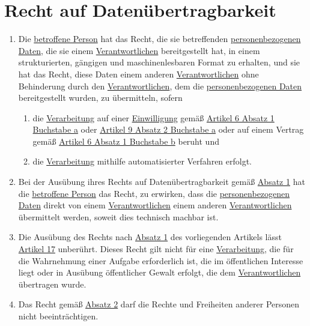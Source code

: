 \chapter{Recht auf Datenübertragbarkeit}
\label{ch:20}


\begin{enumerate}

  \item Die \hyperref[itm:04-1]{betroffene Person} hat das Recht, die sie betreffenden \hyperref[itm:04-1]
   {personenbezogenen Daten}, die sie einem
   \hyperref[itm:04-7]{Verantwortlichen} bereitgestellt hat, in einem strukturierten, gängigen und maschinenlesbaren
    Format zu erhalten, und sie hat das Recht, diese Daten einem anderen \hyperref[itm:04-7]{Verantwortlichen} ohne
    Behinderung durch den \hyperref[itm:04-7]{Verantwortlichen}, dem die
   \hyperref[itm:04-1]{personenbezogenen Daten} bereitgestellt wurden, zu übermitteln, sofern
  \label{itm:20-1}

  \begin{enumerate}
  
    \item die \hyperref[itm:04-2]{Verarbeitung} auf einer \hyperref[itm:04-11]{Einwilligung} gemäß \hyperref[itm:06-1a]
     {Artikel 6 Absatz 1 Buchstabe a} oder
    \hyperref[itm:09-2a]{Artikel 9 Absatz 2 Buchstabe a} oder auf einem Vertrag gemäß \hyperref[itm:06-1b]{Artikel 6
     Absatz 1 Buchstabe b} beruht und
  \label{itm:20-1a}

    \item die \hyperref[itm:04-2]{Verarbeitung} mithilfe automatisierter Verfahren erfolgt.
  \label{itm:20-1b}

  \end{enumerate}

  \item Bei der Ausübung ihres Rechts auf Datenübertragbarkeit gemäß \hyperref[itm:20-1]{Absatz 1} hat die \hyperref
   [itm:04-1]{betroffene Person} das Recht, zu erwirken, dass die \hyperref[itm:04-1]{personenbezogenen Daten} direkt
   von einem \hyperref[itm:04-7]{Verantwortlichen} einem anderen
   \hyperref[itm:04-7]{Verantwortlichen} übermittelt werden, soweit dies technisch machbar ist.
  \label{itm:20-2}

  \item Die Ausübung des Rechts nach \hyperref[itm:20-1]{Absatz 1} des vorliegenden Artikels lässt \hyperref[ch:17]
   {Artikel 17} unberührt. Dieses Recht gilt nicht für eine \hyperref[itm:04-2]{Verarbeitung}, die für die Wahrnehmung
   einer Aufgabe erforderlich ist, die im öffentlichen Interesse liegt oder in Ausübung öffentlicher Gewalt erfolgt,
   die dem
   \hyperref[itm:04-7]{Verantwortlichen} übertragen wurde.
  \label{itm:20-3}

  \item Das Recht gemäß \hyperref[itm:20-2]{Absatz 2} darf die Rechte und Freiheiten anderer Personen nicht
   beeinträchtigen.
  \label{itm:20-4}

\end{enumerate}


